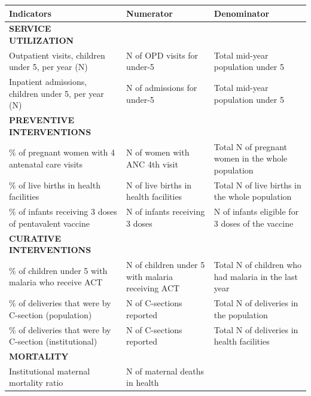\documentclass[
  english,
  letterpaper,
  DIV=11,
  numbers=noendperiod]{scrreprt}
\begin{document}
\begin{longtable}[]{@{}
  >{\raggedright\arraybackslash}p{}
  >{\raggedright\arraybackslash}p{}
  >{\raggedright\arraybackslash}p{}@{}}
\toprule\noalign{}
\begin{minipage}[b]{\linewidth}\raggedright
\textbf{Indicators}
\end{minipage} & \begin{minipage}[b]{\linewidth}\raggedright
\textbf{Numerator}
\end{minipage} & \begin{minipage}[b]{\linewidth}\raggedright
\textbf{Denominator}
\end{minipage} \\
\midrule\noalign{}
\endhead
\bottomrule\noalign{}
\endlastfoot
\textbf{SERVICE UTILIZATION} & & \\
Outpatient visits, children under 5, per year (N) & N of OPD visits for
under-5 & Total mid-year population under 5 \\
Inpatient admissions, children under 5, per year (N) & N of admissions
for under-5 & Total mid-year population under 5 \\
\textbf{PREVENTIVE INTERVENTIONS} & & \\
\% of pregnant women with 4 antenatal care visits & N of women with ANC
4th visit & Total N of pregnant women in the whole population \\
\% of live births in health facilities & N of live births in health
facilities & Total N of live births in the whole population \\
\% of infants receiving 3 doses of pentavalent vaccine & N of infants
receiving 3 doses & N of infants eligible for 3 doses of the vaccine \\
\textbf{CURATIVE INTERVENTIONS} & & \\
\% of children under 5 with malaria who receive ACT & N of children
under 5 with malaria receiving ACT & Total N of children who had malaria
in the last year \\
\% of deliveries that were by C-section (population) & N of C-sections
reported & Total N of deliveries in the population \\
\% of deliveries that were by C-section (institutional) & N of
C-sections reported & Total N of deliveries in health facilities \\
\textbf{MORTALITY} & & \\
Institutional maternal mortality ratio & N of maternal deaths in health

\end{longtable}
\end{document}
